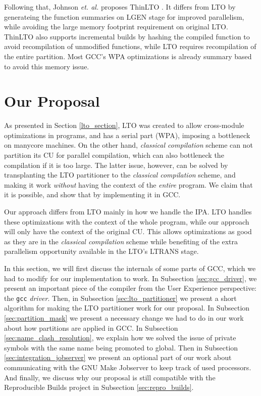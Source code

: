 \documentclass[runningheads]{llncs}
\begin{document}
Following that, Johnson \textit{et. al.} proposes ThinLTO \cite{thinlto}. It
differs from LTO by generateing the function summaries on LGEN stage for
improved parallelism, while avoiding the large memory footprint requirement on
original LTO. ThinLTO also supports incremental builds by hashing the compiled
function to avoid recompilation of unmodified functions, while LTO requires
recompilation of the entire partition. Most GCC's WPA
optimizations is already summary based to avoid this memory issue.


\section{Our Proposal} \label{sec:work}

As presented in Section \ref{lto_section}, LTO was created to allow
cross-module optimizations in programs, and has a serial part (WPA), imposing a
bottleneck on manycore machines. On the other hand, \emph{classical compilation}
scheme can not partition its CU for parallel
compilation, which can also bottleneck the compilation if it is too large.
The latter issue, however, can be solved by transplanting the LTO partitioner
to the \emph{classical compilation} scheme, and making it work \textit{without}
having the context of the \textit{entire} program. We claim that it is possible,
and show that by implementing it in GCC.

Our approach differs from LTO mainly in how we handle the IPA.
LTO handles these optimizations with the context of the whole program, while
our approach will only have the context of the original CU.
This allows optimizations as good as they are in the \emph{classical
compilation} scheme while benefiting of the extra parallelism opportunity
available in the LTO's LTRANS stage.

In this section, we will first discuss the internals of some parts of GCC,
which we had to modify for our implementation to work. In Subsection
\ref{sec:gcc_driver}, we present an important piece of the compiler from the
User Experience perspective: the \texttt{gcc} \textit{driver}. Then, in
Subsection \ref{sec:lto_partitioner} we present a short algorithm for making
the LTO partitioner work for our proposal. In Subsection
\ref{sec:partition_mask} we present a necessary change we had to do in our work
about how partitions are applied in GCC. In
Subsection \ref{sec:name_clash_resolution}, we explain how we solved the issue
of private symbols with the same name being promoted to global.
Then in Subsection \ref{sec:integration_jobserver} we present an optional part
of our work about communicating with the GNU Make Jobserver to keep track of
used processors. And finally, we discuss why our proposal is still compatible
with the Reproducible Builds project in Subsection \ref{sec:repro_builds}.
\end{document}
